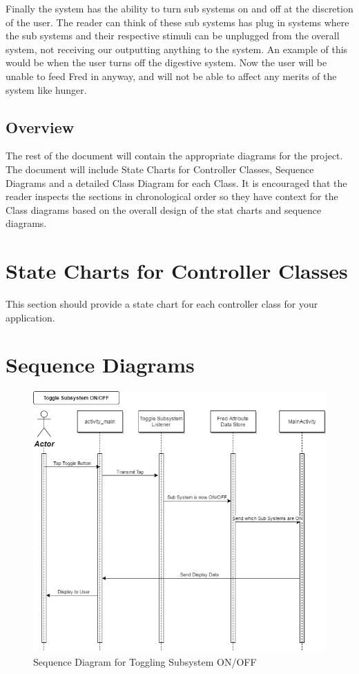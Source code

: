 \documentclass[]{article}
\begin{document}
Finally the system has the ability to turn sub systems on and off at the discretion of the user. The reader can think of these sub systems has plug in systems where the sub systems and their respective stimuli can be unplugged from the overall system, not receiving our outputting anything to the system. An example of this would be when the user turns off the digestive system. Now the user will be unable to feed Fred in anyway, and will not be able to affect any merits of the system like hunger.

\subsection{Overview}
\label{sub:overview}
The rest of the document will contain the appropriate diagrams for the project. The document will include State Charts for Controller Classes, Sequence Diagrams and a detailed Class Diagram for each Class. It is encouraged that the reader inspects the sections in chronological order so they have context for the Class diagrams based on the overall design of the stat charts and sequence diagrams.



\section{State Charts for Controller Classes}
\label{sec:state_charts_for_controller_classes}
This section should provide a state chart for each controller class for your 
application.\\

\section{Sequence Diagrams}
\label{sec:sequence_diagrams}
\begin{figure}[H]
	\centering
	\includegraphics[width=0.7\linewidth]{../Resources/Toggle_Subsystem_Sequence_Diagram.png}
	\caption{Sequence Diagram for Toggling Subsystem ON/OFF}
\end{figure}
\end{document}
